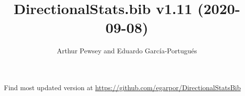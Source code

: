 \documentclass[10pt]{article}
\title{DirectionalStats.bib v1.11 (2020-09-08)}
\author{Arthur Pewsey and Eduardo García-Portugués}
\date{}
\begin{document}
\maketitle

Find most updated version at \url{https://github.com/egarpor/DirectionalStatsBib}

\nocite{*}

\setlength\bibsep{0cm}
\setlength\bibhang{0.25cm}



\end{document}
